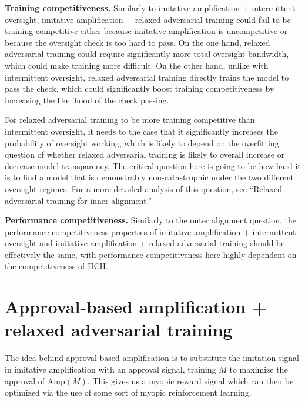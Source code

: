 \documentclass[
  onecolumn,
  natbib,
]{miri-tech-article}
\begin{document}
\textbf{Training competitiveness.} Similarly to imitative amplification + intermittent oversight, imitative amplification + relaxed adversarial training could fail to be training competitive either because imitative amplification is uncompetitive or because the oversight check is too hard to pass. On the one hand, relaxed adversarial training could require significantly more total oversight bandwidth, which could make training more difficult. On the other hand, unlike with intermittent oversight, relaxed adversarial training directly trains the model to pass the check, which could significantly boost training competitiveness by increasing the likelihood of the check passing.

For relaxed adversarial training to be more training competitive than intermittent oversight, it needs to the case that it significantly increases the probability of oversight working, which is likely to depend on the overfitting question of whether relaxed adversarial training is likely to overall increase or decrease model transparency. The critical question here is going to be how hard it is to find a model that is demonstrably non-catastrophic under the two different oversight regimes. For a more detailed analysis of this question, see ``Relaxed adversarial training for inner alignment\cite{TODO: cite https://www.alignmentforum.org/posts/9Dy5YRaoCxH9zuJqa/relaxed-adversarial-training-for-inner-alignment}.''

\textbf{Performance competitiveness.} Similarly to the outer alignment question, the performance competitiveness properties of imitative amplification + intermittent oversight and imitative amplification + relaxed adversarial training should be effectively the same, with performance competitiveness here highly dependent on the competitiveness of HCH.

\section{Approval-based amplification + relaxed adversarial training}
\label{sec:4}

The idea behind approval-based amplification is to substitute the imitation signal in imitative amplification with an approval signal, training $M$ to maximize the approval of $\text{Amp}(M)$. This gives us a myopic reward signal which can then be optimized via the use of some\cite{TODO: cite https://arxiv.org/abs/1709.10163} sort\cite{TODO: cite https://arxiv.org/abs/1902.04257} of myopic reinforcement learning.
\end{document}
